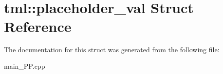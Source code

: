 \hypertarget{structtml_1_1placeholder__val}{\section{tml\+:\+:placeholder\+\_\+val Struct Reference}
\label{structtml_1_1placeholder__val}
}


The documentation for this struct was generated from the following file\+:\begin{DoxyCompactItemize}
\item 
main\+\_\+\+P\+P.\+cpp\end{DoxyCompactItemize}

